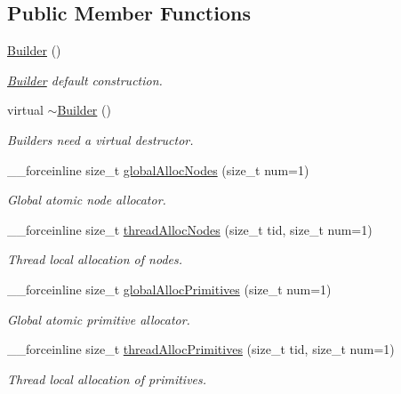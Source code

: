 \subsection*{Public Member Functions}
\begin{DoxyCompactItemize}
\item 
\hyperlink{classembree_1_1_builder_aa7f973aeacd2ecb6837fae9b06ced89e}{Builder} ()
\begin{DoxyCompactList}\small\item\em \hyperlink{classembree_1_1_builder}{Builder} default construction. \item\end{DoxyCompactList}\item 
virtual \hyperlink{classembree_1_1_builder_aaa90623edd90081825e272723756acf6}{$\sim$Builder} ()
\begin{DoxyCompactList}\small\item\em Builders need a virtual destructor. \item\end{DoxyCompactList}\item 
\_\-\_\-forceinline size\_\-t \hyperlink{classembree_1_1_builder_a0ff2e2a1eeafffbf417febe2ad07a4d0}{globalAllocNodes} (size\_\-t num=1)
\begin{DoxyCompactList}\small\item\em Global atomic node allocator. \item\end{DoxyCompactList}\item 
\_\-\_\-forceinline size\_\-t \hyperlink{classembree_1_1_builder_a0b2a4d9c818cdf0a1712ce98ab70b271}{threadAllocNodes} (size\_\-t tid, size\_\-t num=1)
\begin{DoxyCompactList}\small\item\em Thread local allocation of nodes. \item\end{DoxyCompactList}\item 
\_\-\_\-forceinline size\_\-t \hyperlink{classembree_1_1_builder_ac648dbaeb8c35174bf31a81bd15a528e}{globalAllocPrimitives} (size\_\-t num=1)
\begin{DoxyCompactList}\small\item\em Global atomic primitive allocator. \item\end{DoxyCompactList}\item 
\_\-\_\-forceinline size\_\-t \hyperlink{classembree_1_1_builder_a21584f3087a1b946bdf0459427b4e65f}{threadAllocPrimitives} (size\_\-t tid, size\_\-t num=1)
\begin{DoxyCompactList}\small\item\em Thread local allocation of primitives. \item\end{DoxyCompactList}\end{DoxyCompactItemize}
